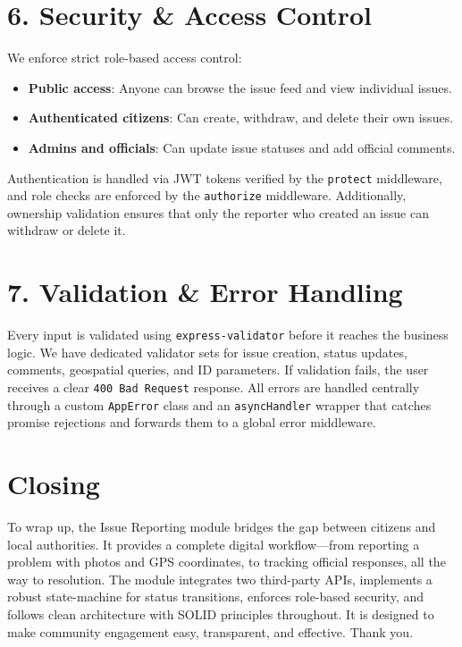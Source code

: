 \documentclass[12pt,a4paper]{article}
\begin{document}
\section{6. Security \& Access Control}

We enforce strict role-based access control:

\begin{itemize}[nosep]
    \item \textbf{Public access}: Anyone can browse the issue feed and view individual issues.
    \item \textbf{Authenticated citizens}: Can create, withdraw, and delete their own issues.
    \item \textbf{Admins and officials}: Can update issue statuses and add official comments.
\end{itemize}

Authentication is handled via JWT tokens verified by the \texttt{protect} middleware, and role checks are enforced by the \texttt{authorize} middleware. Additionally, ownership validation ensures that only the reporter who created an issue can withdraw or delete it.

\section{7. Validation \& Error Handling}

Every input is validated using \texttt{express-validator} before it reaches the business logic. We have dedicated validator sets for issue creation, status updates, comments, geospatial queries, and ID parameters. If validation fails, the user receives a clear \texttt{400 Bad Request} response. All errors are handled centrally through a custom \texttt{AppError} class and an \texttt{asyncHandler} wrapper that catches promise rejections and forwards them to a global error middleware.

\section*{Closing}

To wrap up, the Issue Reporting module bridges the gap between citizens and local authorities. It provides a complete digital workflow---from reporting a problem with photos and GPS coordinates, to tracking official responses, all the way to resolution. The module integrates two third-party APIs, implements a robust state-machine for status transitions, enforces role-based security, and follows clean architecture with SOLID principles throughout. It is designed to make community engagement easy, transparent, and effective. Thank you.
\end{document}
